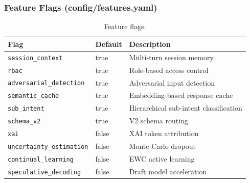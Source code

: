 \documentclass[10pt,journal,onecolumn]{IEEEtran}
\begin{document}
\subsubsection{Feature Flags (config/features.yaml)}
\begin{table}[h]
\caption{Feature flags.}
\label{tab:flags}
\begin{tabularx}{\columnwidth}{>{\ttfamily}l >{\ttfamily}l X}
\toprule
\textbf{Flag} & \textbf{Default} & \textbf{Description}\\
\midrule
\texttt{session\_context} & true & Multi-turn session memory\\
\texttt{rbac} & true & Role-based access control\\
\texttt{adversarial\_detection} & true & Adversarial input detection\\
\texttt{semantic\_cache} & true & Embedding-based response cache\\
\texttt{sub\_intent} & true & Hierarchical sub-intent classification\\
\texttt{schema\_v2} & true & V2 schema routing\\
\texttt{xai} & false & XAI token attribution\\
\texttt{uncertainty\_estimation} & false & Monte Carlo dropout\\
\texttt{continual\_learning} & false & EWC active learning\\
\texttt{speculative\_decoding} & false & Draft model acceleration\\
\bottomrule
\end{tabularx}
\end{table}

\appendices
\end{document}
